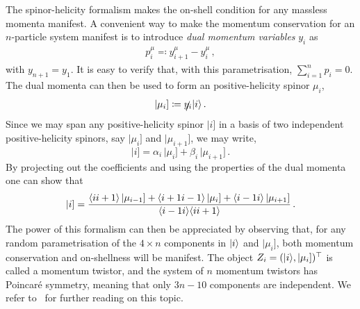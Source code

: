 The spinor-helicity formalism makes the on-shell condition for any massless
momenta manifest. A convenient way
to make the momentum conservation for an $n$-particle system manifest is to
introduce \emph{dual momentum variables} $y_i$ as
\begin{align}
p_i^{\mu} \eqqcolon y_{i+1}^{\mu} - y_i^{\mu} \,,
\end{align}
with $y_{n+1}=y_1$. It is easy to verify that, with this parametrisation, $ \sum_{i=1}^n p_i = 0$.
The dual momenta can then be used to form an positive-helicity
spinor $\mu_i$,
\begin{align}
|\mu_i]  \coloneqq \slashed{y_i} | i \rangle \,.
\end{align}
Since we may span any
positive-helicity spinor $|i]$ in a basis of two independent positive-helicity
spinors, say $|\mu_i]$ and $|\mu_{i+1}]$, we may write,
\begin{equation}
  |i] = \alpha_i \, |\mu_i] + \beta_i \, |\mu_{i+1}] \,.
\end{equation}
By projecting out the coefficients and using the properties of the dual momenta one can show that
\begin{equation} \label{eq:LambdaTildeFromMT}
  |i] = \frac{\langle i i+1 \rangle\,|\mu_{i-1}] + \langle i+1 i-1 \rangle \,|\mu_{i}] + \langle i-1 i \rangle\,|\mu_{i+1}]}{\langle i-1 i \rangle\langle i i+1 \rangle} \,.
\end{equation}
The power of this formalism can then be appreciated by observing that, for
any random parametrisation of the $4\times n$ components in $|i\rangle$ and
$|\mu_{i}]$, both momentum conservation and on-shellness will be manifest. The object $Z_i =
(|i\rangle, |\mu_{i}])^{\top}$ is called a momentum twistor, and the system of $n$ momentum
twistors has Poincar\'{e} symmetry, meaning that only $3n-10$ components are
independent. We refer to~\cite{ch3_Elvang:2013cua} for further reading on this topic.


